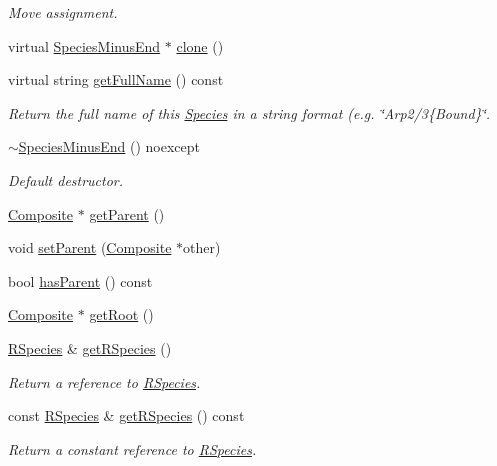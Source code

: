 \begin{DoxyCompactItemize}
\begin{DoxyCompactList}\small\item\em Move assignment. \end{DoxyCompactList}\item 
virtual \hyperlink{classSpeciesMinusEnd}{Species\+Minus\+End} $\ast$ \hyperlink{classSpeciesMinusEnd_a21083383e254146fd074161c7b2cf88b}{clone} ()
\item 
virtual string \hyperlink{classSpeciesMinusEnd_a0c22b4471bd9ca01b2795838e5d4e46a}{get\+Full\+Name} () const 
\begin{DoxyCompactList}\small\item\em Return the full name of this \hyperlink{classSpecies}{Species} in a string format (e.\+g. \char`\"{}\+Arp2/3\{\+Bound\}\char`\"{}. \end{DoxyCompactList}\item 
\hyperlink{classSpeciesMinusEnd_a0a8f2b1b552064b5e814f5da24cc785d}{$\sim$\+Species\+Minus\+End} () noexcept
\begin{DoxyCompactList}\small\item\em Default destructor. \end{DoxyCompactList}\item 
\hyperlink{classComposite}{Composite} $\ast$ \hyperlink{classSpecies_af24cab7cbaa561d35b08fef5faf05fdf}{get\+Parent} ()
\item 
void \hyperlink{classSpecies_acc64c5b61abf911872d433ac32b62de8}{set\+Parent} (\hyperlink{classComposite}{Composite} $\ast$other)
\item 
bool \hyperlink{classSpecies_a40262d7217fcc28a31682aee40a19232}{has\+Parent} () const 
\item 
\hyperlink{classComposite}{Composite} $\ast$ \hyperlink{classSpecies_a876c8a827476a11e05f3b7a7669c29b6}{get\+Root} ()
\item 
\hyperlink{classRSpecies}{R\+Species} \& \hyperlink{classSpecies_a048dd7bc3fecd08b1b1797dc83aa163d}{get\+R\+Species} ()
\begin{DoxyCompactList}\small\item\em Return a reference to \hyperlink{classRSpecies}{R\+Species}. \end{DoxyCompactList}\item 
const \hyperlink{classRSpecies}{R\+Species} \& \hyperlink{classSpecies_aa1069a34b360f84d186f48bd99f80971}{get\+R\+Species} () const 
\begin{DoxyCompactList}\small\item\em Return a constant reference to \hyperlink{classRSpecies}{R\+Species}. \end{DoxyCompactList}\item 

\end{DoxyCompactItemize}
